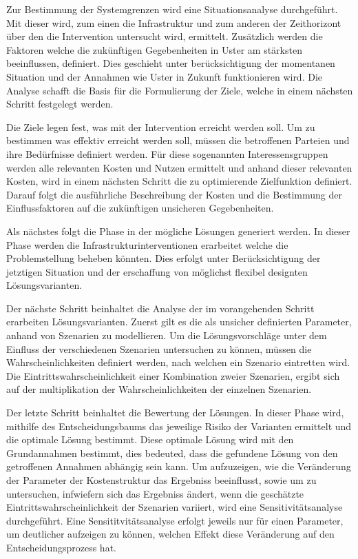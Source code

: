 \begin{IMleftrightskip}
Zur Bestimmung der Systemgrenzen wird eine Situationsanalyse durchgeführt. Mit dieser wird, zum einen die Infrastruktur und zum anderen der Zeithorizont über den die Intervention untersucht wird, ermittelt. Zusätzlich werden die Faktoren welche die zukünftigen Gegebenheiten in Uster am stärksten beeinflussen, definiert. Dies geschieht unter berücksichtigung der momentanen Situation und der Annahmen wie Uster in Zukunft funktionieren wird. Die Analyse schafft die Basis für die Formulierung der Ziele, welche in einem nächsten Schritt festgelegt werden.

Die Ziele legen fest, was mit der Intervention erreicht werden soll. Um zu bestimmen was effektiv erreicht werden soll, müssen die betroffenen Parteien und ihre Bedürfnisse definiert werden. Für diese sogenannten Interessensgruppen werden alle relevanten Kosten und Nutzen ermittelt und anhand dieser relevanten Kosten, wird in einem nächsten Schritt die zu optimierende Zielfunktion definiert.
Darauf folgt die ausführliche Beschreibung der Kosten und die Bestimmung der Einflussfaktoren auf die zukünftigen unsicheren Gegebenheiten. 

Als nächstes folgt die Phase in der mögliche Lösungen generiert werden. In dieser Phase werden die Infrastrukturinterventionen erarbeitet welche die Problemstellung beheben könnten. Dies erfolgt unter Berücksichtigung der jetztigen Situation und der erschaffung von möglichst flexibel designten Lösungsvarianten.

Der nächste Schritt beinhaltet die Analyse der im vorangehenden Schritt erarbeiten Lösungsvarianten. Zuerst gilt es die als unsicher definierten Parameter, anhand von Szenarien zu modellieren. Um die Lösungsvorschläge unter dem Einfluss der verschiedenen Szenarien untersuchen zu können, müssen die Wahrscheinlichkeiten definiert werden, nach welchen ein Szenario eintretten wird. Die Eintrittswahrscheinlichkeit einer Kombination zweier Szenarien, ergibt sich auf der multiplikation der Wahrscheinlichkeiten der einzelnen Szenarien.

Der letzte Schritt beinhaltet die Bewertung der Lösungen. In dieser Phase wird, mithilfe des Entscheidungsbaums das jeweilige Risiko der Varianten ermittelt und die optimale Lösung bestimmt. Diese optimale Lösung wird mit den Grundannahmen bestimmt, dies bedeuted, dass die gefundene Lösung von den getroffenen Annahmen abhängig sein kann. Um aufzuzeigen, wie die Veränderung der Parameter der Kostenstruktur das Ergebniss beeinflusst, sowie um zu untersuchen, infwiefern sich das Ergebniss ändert, wenn die geschätzte Eintrittswahrscheinlichkeit der Szenarien variiert, wird eine Sensitivitätsanalyse durchgeführt.
Eine Sensititvitätsanalyse erfolgt jeweils nur für einen Parameter, um deutlicher aufzeigen zu können, welchen Effekt diese Veränderung auf den Entscheidungsprozess hat. 
\end{IMleftrightskip}

